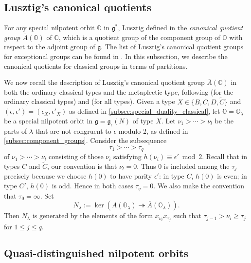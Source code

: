 \documentclass[11pt, a4paper]{amsart}
\newcommand{\g}{\mathfrak{g}}
\newcommand{\orb}{\mathbb{O}}
\newcommand{\fg}{\mathfrak{g}}
\newcommand{\Abar}{\bar{A}}
\newcommand{\mC}{\widetilde{C}}
\theoremstyle{definition}
\numberwithin{equation}{section}
\begin{document}
\subsection{Lusztig's canonical quotients} 
\label{subsec:Abar}

For any special nilpotent orbit $\orb$ in $\fg^*$, Lusztig defined in \cite{Lusztig:book} the \emph{canonical quotient group $\Abar(\orb)$} of $\orb$, which is a quotient group of the component group of $\orb$ with respect to the adjoint group of $\fg$. The list of Lusztig's canonical quotient groups for exceptional groups can be found in \cite{Lusztig:book}. In this subsection, we describe the canonical quotients for classical groups in terms of partitions.

We now recall the description of Lusztig's canonical quotient group $\Abar(\orb)$ in both the ordinary classical types and the metaplectic type, following
\cite[Section 5]{Sommers:Duality} (for the ordinary classical types) and \cite[Section 6.2]{JLS:Duality} (for all types). Given a type $X \in \{B, C, D, \mC\}$ and $(\epsilon, \epsilon') = (\epsilon_X,\epsilon'_X)$ as defined in \cref{subsec:special_duality_classical}, let $\orb = \orb_\lambda$ be a special nilpotent orbit in $\g = \g_\epsilon(N)$ of type $X$. Let $\nu_1>\cdots>\nu_l$ be the parts of $\lambda$ that are not congruent to $\epsilon$ modulo 2, as defined in \cref{subsec:component_groups}.
Consider the subsequence 
  \[\tau_1>\cdots>\tau_q\] 
of $\nu_1>\cdots>\nu_l$ consisting of those $\nu_i$ satisfying $h(\nu_i)\equiv\epsilon'\bmod 2$.
Recall that in types $C$ and $\mC$, our convention is that $\nu_l=0$. Thus $0$ is included among the $\tau_j$ precisely because we choose $h(0)$ to have parity $\epsilon'$: in type $C$, $h(0)$ is even; in
type $C'$, $h(0)$ is odd. Hence in both cases $\tau_q=0$. We also
make the convention that $\tau_0=\infty$.
Set 
	\[ N_\lambda := \ker(A(\orb_\lambda) \twoheadrightarrow \Abar(\orb_\lambda)). \] 
Then $N_\lambda$ is generated by the elements of the form $x_{\nu_{i}} x_{\tau_{j}}$ such that $\tau_{j-1} > \nu_{i} \geqslant \tau_{j}$ for $1 \leqslant j \leqslant q$.


\subsection{Quasi-distinguished nilpotent orbits}\label{subsec:quasi-dist}
\end{document}
